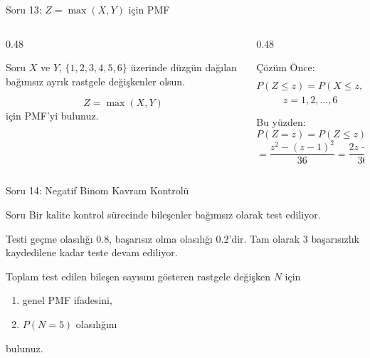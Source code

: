 \documentclass[light]{lutbeamer}
\begin{document}
\begin{frame}{Soru 13: $Z=\max(X,Y)$ için PMF}
\scriptsize
\begin{columns}[T,onlytextwidth]
    \begin{column}{0.48\textwidth}
        \begin{block}{Soru}
            $X$ ve $Y$, $\{1,2,3,4,5,6\}$ üzerinde düzgün dağılan bağımsız ayrık rastgele değişkenler olsun.

            \vspace{0.15cm}
            \[
            Z=\max(X,Y)
            \]
            için PMF'yi bulunuz.
        \end{block}
    \end{column}
    \begin{column}{0.48\textwidth}
        \begin{exampleblock}{Çözüm}
            Önce:
            \[
            P(Z \le z)=P(X \le z,\;Y \le z)=\left(\frac{z}{6}\right)^2
            \]
            \[
            z=1,2,\ldots,6
            \]

            Bu yüzden:
            \[
            P(Z=z)=P(Z \le z)-P(Z \le z-1)
            \]
            \[
            =\frac{z^2-(z-1)^2}{36}
            =\frac{2z-1}{36}, \qquad z=1,\ldots,6
            \]
        \end{exampleblock}
    \end{column}
\end{columns}
\end{frame}

\begin{frame}{Soru 14: Negatif Binom Kavram Kontrolü}
\scriptsize
\begin{block}{Soru}
    Bir kalite kontrol sürecinde bileşenler bağımsız olarak test ediliyor.

    \vspace{0.15cm}
    Testi geçme olasılığı $0.8$, başarısız olma olasılığı $0.2$'dir. Tam olarak 3 başarısızlık kaydedilene kadar teste devam ediliyor.

    \vspace{0.15cm}
    Toplam test edilen bileşen sayısını gösteren rastgele değişken $N$ için
    \begin{enumerate}
        \item genel PMF ifadesini,
        \item $P(N=5)$ olasılığını
    \end{enumerate}
    bulunuz.
\end{block}
\end{frame}
\end{document}
